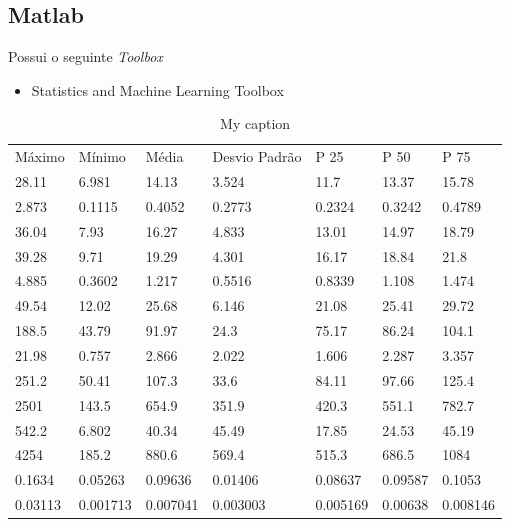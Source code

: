 \documentclass[11pt,a4paper]{article}
\numberwithin{equation}{section}
\begin{document}
\subsection{Matlab}
Possui o seguinte \textit{Toolbox}
\begin{itemize}
\item Statistics and Machine Learning Toolbox
\end{itemize}


\begin{table}[]
\centering
\caption{My caption}
\label{my-label}
\begin{tabular}{lllllll}
Máximo  & Mínimo   & Média    & Desvio Padrão & P 25 & P 50 & P 75 \\
28.11   & 6.981    & 14.13    & 3.524         & 11.7         & 13.37        & 15.78        \\
2.873   & 0.1115   & 0.4052   & 0.2773        & 0.2324       & 0.3242       & 0.4789       \\
36.04   & 7.93     & 16.27    & 4.833         & 13.01        & 14.97        & 18.79        \\
39.28   & 9.71     & 19.29    & 4.301         & 16.17        & 18.84        & 21.8         \\
4.885   & 0.3602   & 1.217    & 0.5516        & 0.8339       & 1.108        & 1.474        \\
49.54   & 12.02    & 25.68    & 6.146         & 21.08        & 25.41        & 29.72        \\
188.5   & 43.79    & 91.97    & 24.3          & 75.17        & 86.24        & 104.1        \\
21.98   & 0.757    & 2.866    & 2.022         & 1.606        & 2.287        & 3.357        \\
251.2   & 50.41    & 107.3    & 33.6          & 84.11        & 97.66        & 125.4        \\
2501    & 143.5    & 654.9    & 351.9         & 420.3        & 551.1        & 782.7        \\
542.2   & 6.802    & 40.34    & 45.49         & 17.85        & 24.53        & 45.19        \\
4254    & 185.2    & 880.6    & 569.4         & 515.3        & 686.5        & 1084         \\
0.1634  & 0.05263  & 0.09636  & 0.01406       & 0.08637      & 0.09587      & 0.1053       \\
0.03113 & 0.001713 & 0.007041 & 0.003003      & 0.005169     & 0.00638      & 0.008146     \\

\end{tabular}
\end{table}
\end{document}
